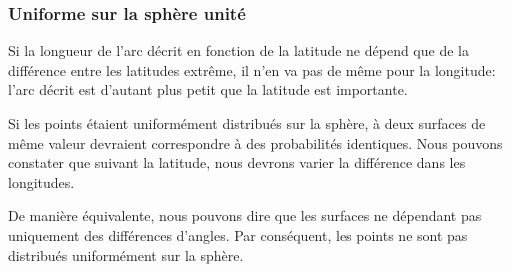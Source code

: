 \documentclass[t,usepdftitle=false]{beamer}
\begin{document}
\begin{frame}[fragile]
\frametitle{Uniforme sur la sphère unité}

Si la longueur de l'arc décrit en fonction de la latitude ne dépend que de la différence entre les latitudes extrême,
il n'en va pas de même pour la longitude: l'arc décrit est d'autant plus petit que la latitude est importante.

\mbox{}

Si les points étaient uniformément distribués sur la sphère, à deux surfaces de même valeur devraient correspondre à des probabilités identiques.
Nous pouvons constater que suivant la latitude, nous devrons varier la différence dans les longitudes.


\mbox{}

De manière équivalente, nous pouvons dire que les surfaces ne dépendant pas uniquement des différences d'angles.
Par conséquent, les points ne sont pas distribués uniformément sur la sphère.

\end{frame}
\end{document}
